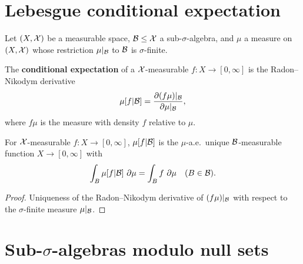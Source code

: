 \section{Lebesgue conditional expectation}

Let $(X, \mathcal{X})$ be a measurable space, $\mathcal{B} \leq \mathcal{X}$ a sub-$\sigma$-algebra, and $\mu$ a measure
on $(X, \mathcal{X})$ whose restriction $\mu|_{\mathcal{B}}$ to $\mathcal{B}$ is $\sigma$-finite.

\begin{definition}
  \label{def:lebesgue-cond-exp}
  \leanok{}

  The {\bf conditional expectation} of a $\mathcal{X}$-measurable $f : X \to [0, \infty]$ is the
  Radon--Nikodym derivative
  \[\mu[f | \mathcal{B}] = \frac{\partial (f\mu)|_{\mathcal{B}}}{\partial \mu|_{\mathcal{B}}},\]
  where $f\mu$ is the measure with density $f$ relative to $\mu$.
\end{definition}

\begin{lemma}
  \label{lem:lebesgue-cond-exp-char}
  \leanok{}

  For $\mathcal{X}$-measurable $f : X \to [0, \infty]$, $\mu[f | \mathcal{B}]$ is the $\mu$-a.e.\ unique
  $\mathcal{B}$-measurable function $X \to [0, \infty]$ with
  \[\int_B \mu[f | \mathcal{B}]\ \partial\mu = \int_B f\ \partial\mu \quad (B \in \mathcal{B}).\]
\end{lemma}
\begin{proof}

  Uniqueness of the Radon--Nikodym derivative of $(f\mu)|_{\mathcal{B}}$ with respect to the
  $\sigma$-finite measure $\mu|_{\mathcal{B}}$.
\end{proof}

\section{Sub-\texorpdfstring{$\sigma$}{sigma}-algebras modulo null sets}

